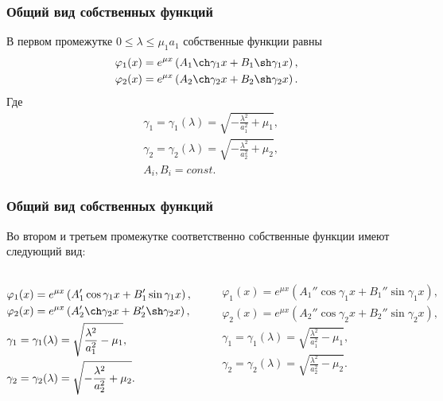 \documentclass[10pt,pdf,hyperref={unicode}]{beamer}
\newcommand{\const}{\ensuremath{const}}
\begin{document}
\begin{frame}
  \frametitle{Общий вид собственных функций}
    В первом промежутке $ 0 \le \lambda \le \mu_1a_1$ собственные функции равны
    \begin{equation*}
      \begin{aligned}
        \varphi_1(x) = e^{\mu x} \left( A_1 \ch \gamma_1x + B_1 \sh \gamma_1x \right),\\
        \varphi_2(x) = e^{\mu x} \left( A_2 \ch \gamma_2x + B_2 \sh \gamma_2x \right).
      \end{aligned}
    \end{equation*}
    Где
    \begin{equation*}
      \begin{aligned}
        & \gamma_1 = \gamma_1(\lambda) = \sqrt{- \frac{\lambda^2}{a_1^2} + \mu_1}, \\
        & \gamma_2 = \gamma_2(\lambda) = \sqrt{- \frac{\lambda^2}{a_2^2} + \mu_2}, \\
        & A_i, B_i = \const.
      \end{aligned}
    \end{equation*}
\end{frame}

\begin{frame}
  \frametitle{Общий вид собственных функций}
  Во втором и третьем промежутке соответственно собственные функции имеют следующий вид:
  \begin{columns}
      \begin{equation*}
        \begin{aligned}
          & \varphi_1(x) = e^{\mu x} \left( A_1' \cos \gamma_1x + B_1' \sin \gamma_1x \right), \\
          & \varphi_2(x) = e^{\mu x} \left( A_2' \ch \gamma_2x + B_2' \sh \gamma_2x \right), \\
          & \gamma_1 = \gamma_1(\lambda) = \sqrt{\frac{\lambda^2}{a_1^2} - \mu_1}, \\
          & \gamma_2 = \gamma_2(\lambda) = \sqrt{- \frac{\lambda^2}{a_2^2} + \mu_2}.
        \end{aligned}
      \end{equation*}


      \begin{equation*}
        \begin{aligned}
          & \varphi_1(x) = e^{\mu x} \left( A_1'' \cos \gamma_1x + B_1'' \sin \gamma_1x \right), \\
          & \varphi_2(x) = e^{\mu x} \left( A_2'' \cos \gamma_2x + B_2'' \sin \gamma_2x \right), \\
          & \gamma_1 = \gamma_1(\lambda) = \sqrt{\frac{\lambda^2}{a_1^2} - \mu_1}, \\
          & \gamma_2 = \gamma_2(\lambda) = \sqrt{\frac{\lambda^2}{a_2^2} - \mu_2}.
        \end{aligned}
      \end{equation*}
  \end{columns}
\end{frame}
\end{document}
